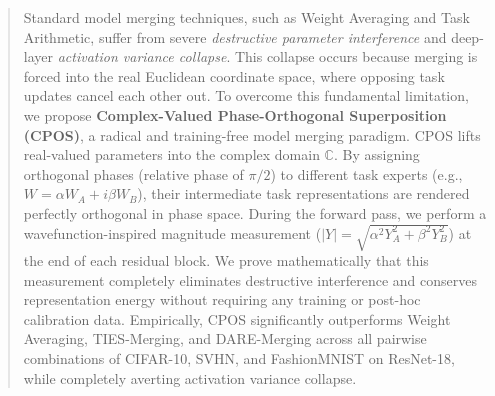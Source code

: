 \documentclass{article}
\theoremstyle{plain}
\theoremstyle{definition}
\theoremstyle{remark}
\begin{document}

\printAffiliationsAndNotice{\icmlEqualContribution}

\begin{abstract}
Standard model merging techniques, such as Weight Averaging and Task Arithmetic, suffer from severe \emph{destructive parameter interference} and deep-layer \emph{activation variance collapse}. This collapse occurs because merging is forced into the real Euclidean coordinate space, where opposing task updates cancel each other out. To overcome this fundamental limitation, we propose \textbf{Complex-Valued Phase-Orthogonal Superposition (CPOS)}, a radical and training-free model merging paradigm. CPOS lifts real-valued parameters into the complex domain $\mathbb{C}$. By assigning orthogonal phases (relative phase of $\pi/2$) to different task experts (e.g., $W = \alpha W_A + i \beta W_B$), their intermediate task representations are rendered perfectly orthogonal in phase space. During the forward pass, we perform a wavefunction-inspired magnitude measurement ($|Y| = \sqrt{\alpha^2 Y_A^2 + \beta^2 Y_B^2}$) at the end of each residual block. We prove mathematically that this measurement completely eliminates destructive interference and conserves representation energy without requiring any training or post-hoc calibration data. Empirically, CPOS significantly outperforms Weight Averaging, TIES-Merging, and DARE-Merging across all pairwise combinations of CIFAR-10, SVHN, and FashionMNIST on ResNet-18, while completely averting activation variance collapse.
\end{abstract}
\end{document}
